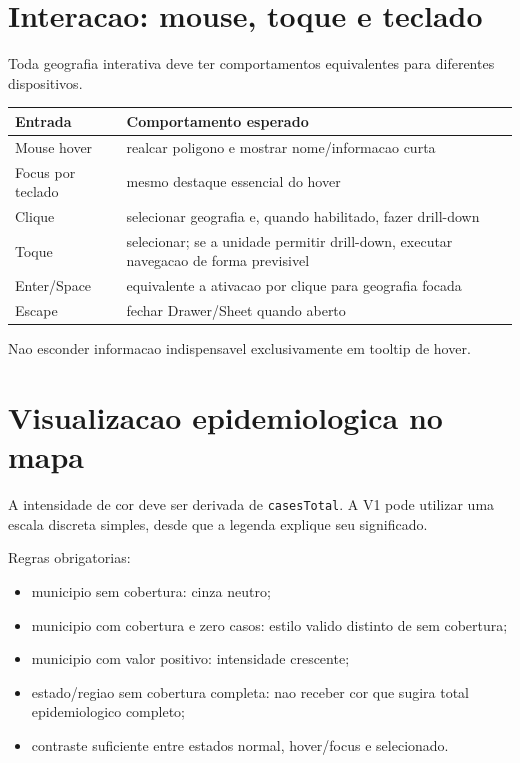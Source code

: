 \documentclass[12pt,a4paper]{article}
\begin{document}
\section{Interacao: mouse, toque e teclado}

Toda geografia interativa deve ter comportamentos equivalentes para diferentes dispositivos.

\begin{tabularx}{\textwidth}{@{}L{3.5cm}Y@{}}
\toprule
\textbf{Entrada} & \textbf{Comportamento esperado} \\
\midrule
Mouse hover & realcar poligono e mostrar nome/informacao curta \\
Focus por teclado & mesmo destaque essencial do hover \\
Clique & selecionar geografia e, quando habilitado, fazer drill-down \\
Toque & selecionar; se a unidade permitir drill-down, executar navegacao de forma previsivel \\
Enter/Space & equivalente a ativacao por clique para geografia focada \\
Escape & fechar Drawer/Sheet quando aberto \\
\bottomrule
\end{tabularx}

Nao esconder informacao indispensavel exclusivamente em tooltip de hover.

\section{Visualizacao epidemiologica no mapa}

A intensidade de cor deve ser derivada de \texttt{casesTotal}. A V1 pode utilizar uma escala discreta simples, desde que a legenda explique seu significado.

Regras obrigatorias:

\begin{itemize}[leftmargin=*]
    \item municipio sem cobertura: cinza neutro;
    \item municipio com cobertura e zero casos: estilo valido distinto de sem cobertura;
    \item municipio com valor positivo: intensidade crescente;
    \item estado/regiao sem cobertura completa: nao receber cor que sugira total epidemiologico completo;
    \item contraste suficiente entre estados normal, hover/focus e selecionado.
\end{itemize}
\end{document}
